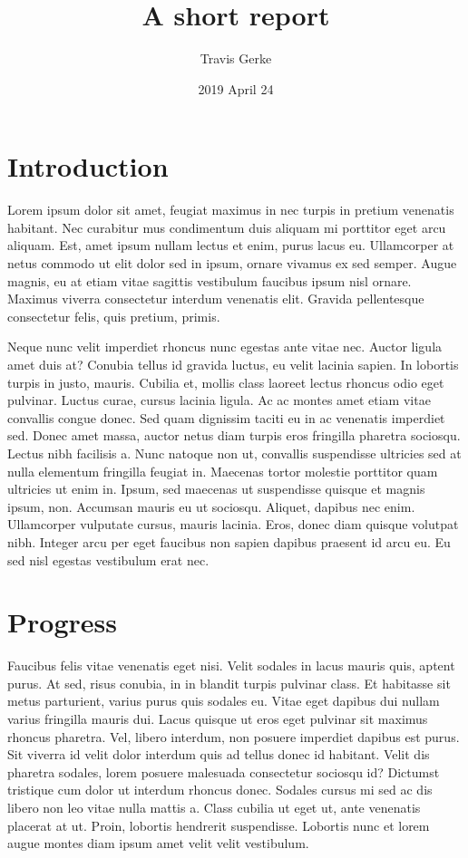 \documentclass[]{article}
\title{A short report}
\author{Travis Gerke}
\date{2019 April 24}
\makeatletter
\renewcommand{\maketitle}{\bgroup\vspace*{-1cm}\setlength{\parindent}{0pt}
\begin{flushleft}
  \@author
  
  \@date
  
\end{flushleft}\egroup
}
\makeatother
\begin{document}
\maketitle

\hypertarget{introduction}{%
\section{Introduction}\label{introduction}}

Lorem ipsum dolor sit amet, feugiat maximus in nec turpis in pretium
venenatis habitant. Nec curabitur mus condimentum duis aliquam mi
porttitor eget arcu aliquam. Est, amet ipsum nullam lectus et enim,
purus lacus eu. Ullamcorper at netus commodo ut elit dolor sed in ipsum,
ornare vivamus ex sed semper. Augue magnis, eu at etiam vitae sagittis
vestibulum faucibus ipsum nisl ornare. Maximus viverra consectetur
interdum venenatis elit. Gravida pellentesque consectetur felis, quis
pretium, primis.

Neque nunc velit imperdiet rhoncus nunc egestas ante vitae nec. Auctor
ligula amet duis at? Conubia tellus id gravida luctus, eu velit lacinia
sapien. In lobortis turpis in justo, mauris. Cubilia et, mollis class
laoreet lectus rhoncus odio eget pulvinar. Luctus curae, cursus lacinia
ligula. Ac ac montes amet etiam vitae convallis congue donec. Sed quam
dignissim taciti eu in ac venenatis imperdiet sed. Donec amet massa,
auctor netus diam turpis eros fringilla pharetra sociosqu. Lectus nibh
facilisis a. Nunc natoque non ut, convallis suspendisse ultricies sed at
nulla elementum fringilla feugiat in. Maecenas tortor molestie porttitor
quam ultricies ut enim in. Ipsum, sed maecenas ut suspendisse quisque et
magnis ipsum, non. Accumsan mauris eu ut sociosqu. Aliquet, dapibus nec
enim. Ullamcorper vulputate cursus, mauris lacinia. Eros, donec diam
quisque volutpat nibh. Integer arcu per eget faucibus non sapien dapibus
praesent id arcu eu. Eu sed nisl egestas vestibulum erat nec.

\hypertarget{progress}{%
\section{Progress}\label{progress}}

Faucibus felis vitae venenatis eget nisi. Velit sodales in lacus mauris
quis, aptent purus. At sed, risus conubia, in in blandit turpis pulvinar
class. Et habitasse sit metus parturient, varius purus quis sodales eu.
Vitae eget dapibus dui nullam varius fringilla mauris dui. Lacus quisque
ut eros eget pulvinar sit maximus rhoncus pharetra. Vel, libero
interdum, non posuere imperdiet dapibus est purus. Sit viverra id velit
dolor interdum quis ad tellus donec id habitant. Velit dis pharetra
sodales, lorem posuere malesuada consectetur sociosqu id? Dictumst
tristique cum dolor ut interdum rhoncus donec. Sodales cursus mi sed ac
dis libero non leo vitae nulla mattis a. Class cubilia ut eget ut, ante
venenatis placerat at ut. Proin, lobortis hendrerit suspendisse.
Lobortis nunc et lorem augue montes diam ipsum amet velit velit
vestibulum.
\end{document}
